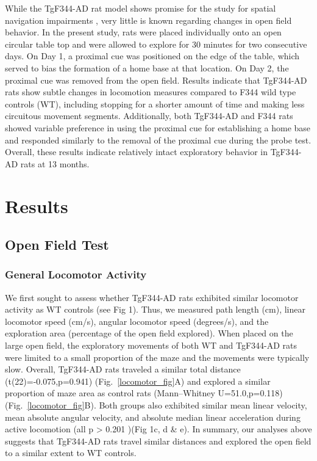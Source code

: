 \documentclass[fleqn,10pt]{wlscirep}
\begin{document}
While the TgF344-AD rat model shows promise for the study for spatial navigation impairments \cite{berkowitz_progressive_2018}, very little is known regarding changes in open field behavior. In the present study, rats were placed individually onto an open circular table top and were allowed to explore for 30 minutes for two consecutive days. On Day 1, a proximal cue was positioned on the edge of the table, which served to bias the formation of a home base at that location. On Day 2, the proximal cue was removed from the open field. Results indicate that TgF344-AD rats show subtle changes in locomotion measures compared to F344 wild type controls (WT), including stopping for a shorter amount of time and making less circuitous movement segments. Additionally, both TgF344-AD and F344 rats showed variable preference in using the proximal cue for establishing a home base and responded similarly to the removal of the proximal cue during the probe test. Overall, these results indicate relatively intact exploratory behavior in TgF344-AD rats at 13 months.   

\section*{Results}

\subsection*{Open Field Test}

\subsubsection*{General Locomotor Activity}
We first sought to assess whether TgF344-AD rats exhibited similar locomotor activity as WT controls (see Fig 1). Thus, we measured path length (cm), linear locomotor speed (cm/s), angular locomotor speed (degrees/s), and the exploration area (percentage of the open field explored). When placed on the large open field, the exploratory movements of both WT and TgF344-AD rats were limited to a small proportion of the maze and the movements were typically slow.  Overall, TgF344-AD rats traveled a similar total distance (t(22)=-0.075,p=0.941) (Fig.~\ref{locomotor_fig}A) and explored a similar proportion of maze area as control rats (Mann–Whitney U=51.0,p=0.118) (Fig.~\ref{locomotor_fig}B). Both groups also exhibited similar mean linear velocity, mean absolute angular velocity, and absolute median linear acceleration during active locomotion (all p > 0.201 )(Fig 1c, d \& e). In summary, our analyses above suggests that TgF344-AD rats travel similar distances and explored the open field to a similar extent to WT controls.  
\end{document}
